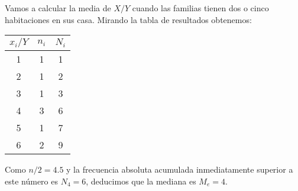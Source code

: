 \subproblem
Vamos a calcular la media de $X/Y$ cuando las familias tienen dos o cinco habitaciones en sus casa. Mirando la tabla de resultados obtenemos:

\begin{table}[ht]
    \begin{tabular}{|c|c|c|}
        \hline
         $x_i/Y$ & $n_{i}$ & $N_{i}$ \\ \hline
         1 & 1 & 1 \\ \hline 
         2 & 1 & 2 \\ \hline 
         3 & 1 & 3 \\ \hline 
         4 & 3 & 6 \\ \hline 
         5 & 1 & 7 \\ \hline  
         6 & 2 & 9 \\ \hline 
    \end{tabular}
\end{table}

Como $n/2 = 4.5$ y la frecuencia absoluta acumulada inmediatamente superior a este número es $N_{4} = 6$, deducimos que la mediana es $M_e = 4$.

